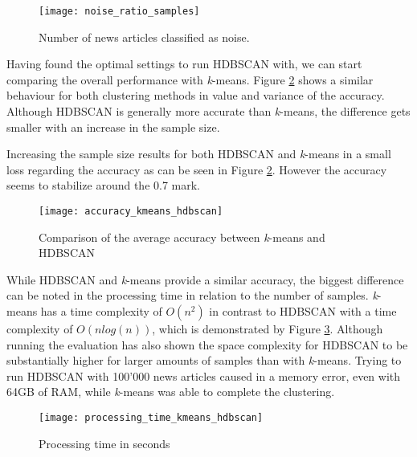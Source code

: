 

\begin{figure}[h]
    \centering
    \texttt{[image: noise\_ratio\_samples]}
    \caption{Number of news articles classified as noise.}
    \label{fig:noise_ratio_samples}
\end{figure}


Having found the optimal settings to run HDBSCAN with, we can start comparing the overall performance with \textit{k}-means. Figure \ref{fig:accuracy_kmeans_hdbscan} shows  a similar behaviour for both clustering methods in value and variance of the accuracy. Although HDBSCAN is generally more accurate than \textit{k}-means, the difference gets smaller with an increase in the sample size. 

Increasing the sample size results for both HDBSCAN and \textit{k}-means in a small loss regarding the accuracy as can be seen in Figure \ref{fig:accuracy_kmeans_hdbscan}. However the accuracy seems to stabilize around the 0.7 mark.

\begin{figure}[h]
    \centering
    \texttt{[image: accuracy\_kmeans\_hdbscan]}
    \caption{Comparison of the average accuracy between \textit{k}-means and HDBSCAN}
    \label{fig:accuracy_kmeans_hdbscan}
\end{figure}

While HDBSCAN and \textit{k}-means provide a similar accuracy, the biggest difference can be noted in the processing time in relation to the number of samples. \textit{k}-means has a time complexity of $O(n^2)$ in contrast to HDBSCAN with a time complexity of $O(nlog(n))$, which is demonstrated by Figure \ref{fig:processing_time_kmeans_hdbscan}. Although running the evaluation has also shown the space complexity for HDBSCAN to be substantially higher for larger amounts of samples than with \textit{k}-means. Trying to run HDBSCAN with 100'000 news articles caused in a memory error, even with 64GB of RAM, while \textit{k}-means was able to complete the clustering.


\begin{figure}[h]
    \centering
    \texttt{[image: processing\_time\_kmeans\_hdbscan]}
    \caption{Processing time in seconds }
    \label{fig:processing_time_kmeans_hdbscan}
\end{figure}

